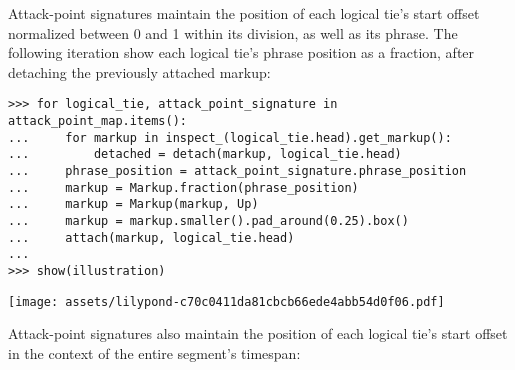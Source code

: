 \noindent Attack-point signatures maintain the position of each logical tie's
start offset normalized between 0 and 1 within its division, as well as its
phrase. The following iteration show each logical tie's phrase position as a
fraction, after detaching the previously attached markup:

\begin{comment}
<abjad>[stylesheet=../consort.ily]
for logical_tie, attack_point_signature in attack_point_map.items():
    for markup in inspect_(logical_tie.head).get_markup():
        detached = detach(markup, logical_tie.head)
    phrase_position = attack_point_signature.phrase_position
    markup = Markup.fraction(phrase_position)
    markup = Markup(markup, Up)
    markup = markup.smaller().pad_around(0.25).box()
    attach(markup, logical_tie.head)

show(illustration)
</abjad>
\end{comment}

\begin{abjadbookoutput}
\begin{singlespacing}
\vspace{-0.5\baselineskip}
\begin{verbatim}
>>> for logical_tie, attack_point_signature in attack_point_map.items():
...     for markup in inspect_(logical_tie.head).get_markup():
...         detached = detach(markup, logical_tie.head)
...     phrase_position = attack_point_signature.phrase_position
...     markup = Markup.fraction(phrase_position)
...     markup = Markup(markup, Up)
...     markup = markup.smaller().pad_around(0.25).box()
...     attach(markup, logical_tie.head)
...
>>> show(illustration)
\end{verbatim}
\noindent\texttt{[image: assets/lilypond-c70c0411da81cbcb66ede4abb54d0f06.pdf]}
\end{singlespacing}
\end{abjadbookoutput}

\noindent Attack-point signatures also maintain the position of each logical
tie's start offset in the context of the entire segment's timespan:

\begin{comment}
<abjad>[stylesheet=../consort.ily]
for logical_tie, attack_point_signature in attack_point_map.items():
    for markup in inspect_(logical_tie.head).get_markup():
        detached = detach(markup, logical_tie.head)
    segment_position = attack_point_signature.segment_position
    markup = Markup.fraction(segment_position)
    markup = Markup(markup, Up)
    markup = markup.smaller().pad_around(0.25).box()
    attach(markup, logical_tie.head)

show(illustration)
</abjad>
\end{comment}

